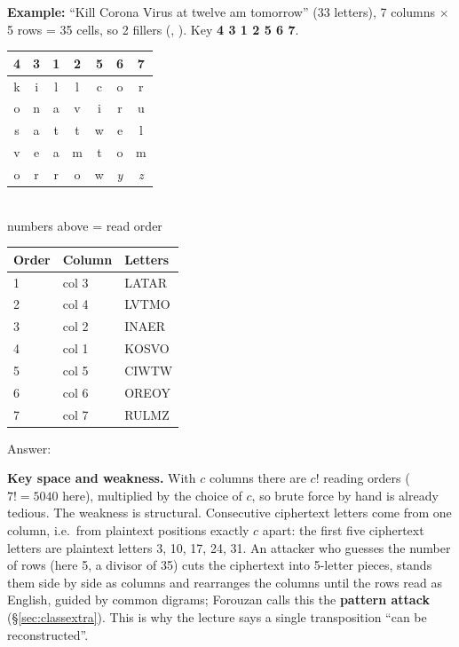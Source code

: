 \textbf{Example:} ``Kill Corona Virus at twelve am tomorrow'' (33 letters), 7 columns $\times$ 5 rows = 35 cells, so 2 fillers (, ). Key \textbf{4 3 1 2 5 6 7}.
\begin{center}\small
\begin{minipage}[c]{0.4\textwidth}\centering
\begin{tabular}{|*{7}{c|}}
\multicolumn{1}{c}{4}&\multicolumn{1}{c}{3}&\multicolumn{1}{c}{\textbf{1}}&\multicolumn{1}{c}{2}&\multicolumn{1}{c}{5}&\multicolumn{1}{c}{6}&\multicolumn{1}{c}{7}\\
\hline
k&i&\cellcolor{warn!18}l&l&c&o&r\\ \hline
o&n&\cellcolor{warn!18}a&v&i&r&u\\ \hline
s&a&\cellcolor{warn!18}t&t&w&e&l\\ \hline
v&e&\cellcolor{warn!18}a&m&t&o&m\\ \hline
o&r&\cellcolor{warn!18}r&o&w&\textit{y}&\textit{z}\\ \hline
\end{tabular}\\[2pt]
{\footnotesize numbers above = read order}
\end{minipage}
\begin{minipage}[c]{0.5\textwidth}
\begin{tabular}{@{}lll@{}}
\toprule
Order & Column & Letters\\
\midrule
1 & col 3 & LATAR\\
2 & col 4 & LVTMO\\
3 & col 2 & INAER\\
4 & col 1 & KOSVO\\
5 & col 5 & CIWTW\\
6 & col 6 & OREOY\\
7 & col 7 & RULMZ\\
\bottomrule
\end{tabular}
\end{minipage}
\end{center}
Answer: \textbf{}

\textbf{Key space and weakness.} With $c$ columns there are $c!$ reading orders ($7! = 5040$ here), multiplied by the choice of $c$, so brute force by hand is already tedious. The weakness is structural. Consecutive ciphertext letters come from one column, i.e.\ from plaintext positions exactly $c$ apart: the first five ciphertext letters are plaintext letters 3, 10, 17, 24, 31. An attacker who guesses the number of rows (here 5, a divisor of 35) cuts the ciphertext into 5-letter pieces, stands them side by side as columns and rearranges the columns until the rows read as English, guided by common digrams; Forouzan calls this the \textbf{pattern attack} (\S\ref{sec:classextra}). This is why the lecture says a single transposition ``can be reconstructed''.

